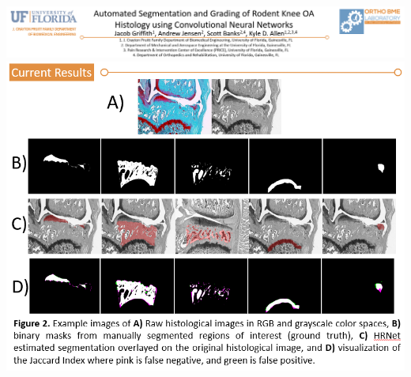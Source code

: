 \begin{frame}
   \centering
      \includegraphics[width=\linewidth]{images/histology-title.png}
      \vfill
      \includegraphics[width=0.65\linewidth]{images/histology-images.png}
\end{frame}

